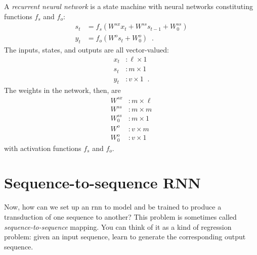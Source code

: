 A {\it recurrent neural network} is a state machine with neural
networks constituting functions $f_s$ and $f_o$:
\begin{align}
  s_t & = f_s\left(W^{sx}x_t + W^{ss}s_{t - 1} + W^{ss}_0\right) \\
  y_t & = f_o\left(W^o s_t + W_0^o\right) \;\;.
\end{align}
The inputs, states, and outputs are all vector-valued:
\begin{align}
  x_t & : \ell \times 1    \\
  s_t & : m \times 1       \\
  y_t & : v \times 1 \;\;.
\end{align}
The weights in the network,  then,  are
\begin{align}
  W^{sx}   & :  m \times \ell \\
  W^{ss}   & : m \times m     \\
  W^{ss}_0 & : m \times 1     \\
  W^{o}    & : v \times m     \\
  W^{o}_0  & : v \times 1
\end{align}
with activation functions $f_s$  and $f_o$.


\section{Sequence-to-sequence RNN}

\label{sec-seq2seq_rnn}

Now, how can we set up an {\sc rnn} to model and be trained to produce
a transduction of one sequence to another?  This problem is sometimes
called {\em sequence-to-sequence} mapping.  You can think of it as a
kind of regression problem: given an input sequence, learn to generate
the corresponding output sequence. 

